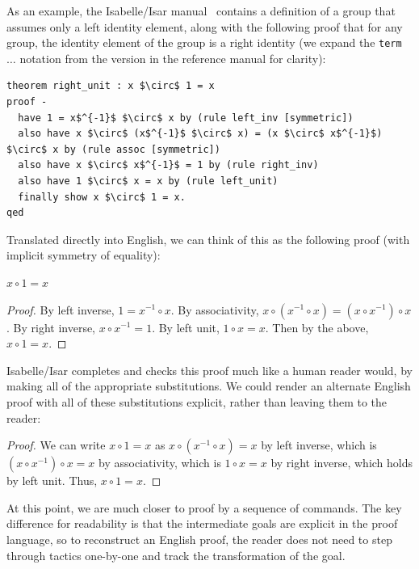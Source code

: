 As an example, the Isabelle/Isar manual~\citep{wenzel2004isabelle} contains a definition of a group
that assumes only a left identity element, along with the following proof
that for any group, the identity element of the group is a right identity (we expand the 
\lstinline{term} $\ldots$ notation from the version in the reference manual for clarity):
\begin{lstlisting}
theorem right_unit : x $\circ$ 1 = x
proof -
  have 1 = x$^{-1}$ $\circ$ x by (rule left_inv [symmetric])
  also have x $\circ$ (x$^{-1}$ $\circ$ x) = (x $\circ$ x$^{-1}$) $\circ$ x by (rule assoc [symmetric])
  also have x $\circ$ x$^{-1}$ = 1 by (rule right_inv)
  also have 1 $\circ$ x = x by (rule left_unit)
  finally show x $\circ$ 1 = x.
qed
\end{lstlisting}
Translated directly into English, we can think of this as the following proof (with implicit symmetry of equality):
%
\begin{theorem}
$x \circ 1 = x$
\end{theorem}
%
\begin{proof}
By left inverse, $1 = x^{-1} \circ x$. By associativity, $x \circ (x^{-1} \circ x) = (x \circ x^{-1}) \circ x$.
By right inverse, $x \circ x^{-1} = 1$. By left unit, $1 \circ x = x$. Then by the above, $x \circ 1 = x$.
\end{proof}
Isabelle/Isar completes and checks this proof much like a human reader would, by making all of the appropriate substitutions.
We could render an alternate English proof with all of these substitutions explicit, rather than leaving them to the reader:
%
\begin{proof}
We can write $x \circ 1 = x$ as $x \circ (x^{-1} \circ x) = x$ by left inverse,
which is $(x \circ x^{-1}) \circ x = x$ by associativity,
which is $1 \circ x = x$ by right inverse,
which holds by left unit.
Thus, $x \circ 1 = x$.
\end{proof}
%
At this point, we are much closer to proof by a sequence of commands. The key difference for readability is that the intermediate goals are explicit
in the proof language, so to reconstruct an English proof, the reader does not need to step through tactics one-by-one and track the transformation of the goal.



